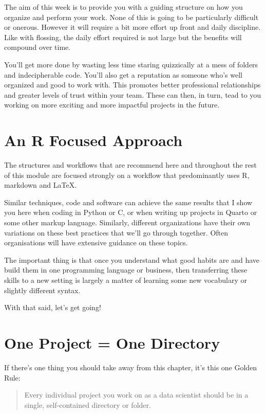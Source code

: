 \documentclass[
  12pt,
]{book}
\begin{document}
The aim of this week is to provide you with a guiding structure on how you organize and perform your work. None of this is going to be particularly difficult or onerous. However it will require a bit more effort up front and daily discipline. Like with flossing, the daily effort required is not large but the benefits will compound over time.

You'll get more done by wasting less time staring quizzically at a mess of
folders and indecipherable code. You'll also get a reputation as someone who's well organized and good to work with. This promotes better professional relationships and greater levels of trust within your team. These can then, in turn, tead to you working on more exciting and more impactful projects in the future.

\hypertarget{an-r-focused-approach}{%
\section{An R Focused Approach}\label{an-r-focused-approach}}

The structures and workflows that are recommend here and throughout the rest of this module are focused strongly on a workflow that predominantly uses R, markdown and LaTeX.

Similar techniques, code and software can achieve the same results that I show you here when coding in Python or C, or when writing up projects in Quarto or some other markup language. Similarly, different organizations have their own variations on these best practices that we'll go through together. Often organisations will have extensive guidance on these topics.

The important thing is that once you understand what good habits are and have build them in one programming language or business, then transferring these skills to a new setting is largely a matter of learning some new vocabulary or slightly different syntax.

With that said, let's get going!

\hypertarget{one-project-one-directory}{%
\section{One Project = One Directory}\label{one-project-one-directory}}

If there's one thing you should take away from this chapter, it's this one
Golden Rule:

\begin{quote}
Every individual project you work on as a data scientist should be in a single, self-contained directory or folder.
\end{quote}
\end{document}
